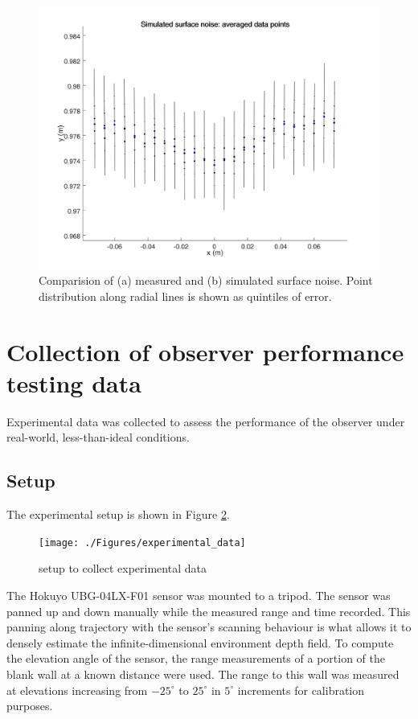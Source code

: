 \begin{figure}
{\begin{minipage}[b]{0.45\columnwidth}
    			\includegraphics[width=1\textwidth,trim = 0mm 0mm 0mm 0mm,clip]{./Figures/simulated_surface_noise}\vspace*{0ex}
 			\end{minipage}}
	  		\caption{Comparision of (a) measured and (b) simulated surface noise. Point distribution along radial lines is shown as quintiles of error.}
	  		\label{fig:surface_noise}
		\end{figure}

\section{Collection of observer performance testing data} \label{testingdata}
	Experimental data was collected to assess the performance of the observer under real-world, less-than-ideal conditions.
	\subsection{Setup}
		The experimental setup is shown in Figure \ref{fig:experimental_data}.
		\begin{figure}
		\centering
			 	\texttt{[image: ./Figures/experimental\_data]}\vspace*{0ex}
			  	\caption{setup to collect experimental data} \label{fig:experimental_data}
		\end{figure}

		The Hokuyo UBG-04LX-F01 sensor was mounted to a tripod. The sensor was panned up and down manually while the measured range and time recorded. This panning along trajectory with the sensor's scanning behaviour is what allows it to densely estimate the infinite-dimensional environment depth field. To compute the elevation angle of the sensor, the range measurements of a portion of the blank wall at a known distance were used. The range to this wall was measured at elevations increasing from  $-25^\circ$ to $25^\circ$ in $5^\circ$ increments for calibration purposes.
		
